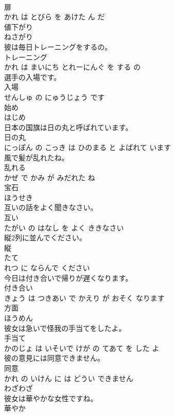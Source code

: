 \documentclass[8pt]{extreport}
\begin{document}
\begin{CJK}{UTF8}{min}
\\	扉 
\\	かれ は とびら を あけた ん だ			
\\	値下がり	
\\	ねさがり		
\\	彼は毎日トレーニングをするの。	
\\	トレーニング 
\\	かれ は まいにち とれーにんぐ を する の			
\\	選手の入場です。	
\\	入場 
\\	せんしゅ の にゅうじょう です			
\\	始め	
\\	はじめ		
\\	日本の国旗は日の丸と呼ばれています。	
\\	日の丸 
\\	にっぽん の こっき は ひのまる と よばれて います			
\\	風で髪が乱れたね。	
\\	乱れる 
\\	かぜ で かみ が みだれた ね			
\\	宝石	
\\	ほうせき		
\\	互いの話をよく聞きなさい。	
\\	互い 
\\	たがい の はなし を よく ききなさい			
\\	縦2列に並んでください。	
\\	縦 
\\	たて 
\\	れつ に ならんで ください			
\\	今日は付き合いで帰りが遅くなります。	
\\	付き合い 
\\	きょう は つきあい で かえり が おそく なります			
\\	方面	
\\	ほうめん		
\\	彼女は急いで怪我の手当てをしたよ。	
\\	手当て 
\\	かのじょ は いそいで けが の てあて を した よ			
\\	彼の意見には同意できません。	
\\	同意 
\\	かれ の いけん に は どうい できません			
\\	わざわざ	
\\	彼女は華やかな女性ですね。	
\\	華やか 

\end{CJK}
\end{document}
